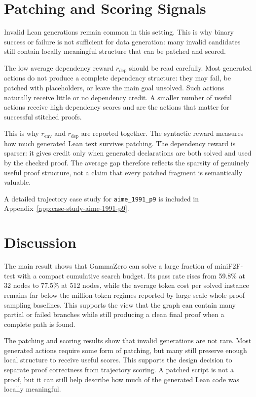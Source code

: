 \section{Patching and Scoring Signals}

Invalid Lean generations remain common in this setting. This is why binary success or failure is not
sufficient for data generation: many invalid candidates still contain locally meaningful structure that
can be patched and scored.

The low average dependency reward \(r_{\mathrm{dep}}\) should be read carefully. Most generated actions
do not produce a complete dependency structure: they may fail, be patched with placeholders, or leave
the main goal unsolved. Such actions naturally receive little or no dependency credit. A smaller number
of useful actions receive high dependency scores and are the actions that matter for successful stitched
proofs.

This is why \(r_{\mathrm{env}}\) and \(r_{\mathrm{dep}}\) are reported together. The syntactic reward measures
how much generated Lean text survives patching. The dependency reward is sparser: it gives credit only
when generated declarations are both solved and used by the checked proof. The average gap therefore
reflects the sparsity of genuinely useful proof structure, not a claim that every patched fragment is
semantically valuable.

A detailed trajectory case study for \texttt{aime\_1991\_p9} is included in Appendix~\ref{app:case-study-aime-1991-p9}.

\section{Discussion}

The main result shows that GammaZero can solve a large fraction of miniF2F-test with a compact
cumulative search budget. Its pass rate rises from 59.8\% at 32 nodes to 77.5\% at 512 nodes, while
the average token cost per solved instance remains far below the million-token regimes reported by
large-scale whole-proof sampling baselines. This supports the view that the graph can contain many
partial or failed branches while still producing a clean final proof when a complete path is found.

The patching and scoring results show that invalid generations are not rare. Most generated actions require some form of patching, but many still preserve enough local structure to receive useful scores. This supports the design decision to separate proof correctness from trajectory scoring. A patched script is not a proof, but it can still help describe how much of the generated Lean code was locally meaningful.

